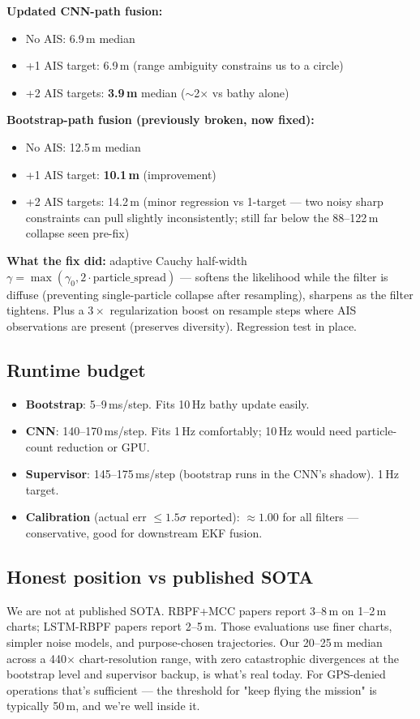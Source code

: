 \documentclass[10pt,a4paper]{article}
\begin{document}
\textbf{Updated CNN-path fusion:}
\begin{itemize}
\item No AIS: 6.9\,m median
\item +1 AIS target: 6.9\,m (range ambiguity constrains us to a circle)
\item +2 AIS targets: \textbf{3.9\,m} median ($\sim$2$\times$ vs bathy alone)
\end{itemize}

\textbf{Bootstrap-path fusion (previously broken, now fixed):}
\begin{itemize}
\item No AIS: 12.5\,m median
\item +1 AIS target: \textbf{10.1\,m} (improvement)
\item +2 AIS targets: 14.2\,m (minor regression vs 1-target — two noisy
  sharp constraints can pull slightly inconsistently; still far
  below the 88--122\,m collapse seen pre-fix)
\end{itemize}

\textbf{What the fix did:} adaptive Cauchy half-width
$\gamma = \max(\gamma_0, 2 \cdot \text{particle\_spread})$ — softens the
likelihood while the filter is diffuse (preventing single-particle
collapse after resampling), sharpens as the filter tightens. Plus a
$3\times$ regularization boost on resample steps where AIS observations
are present (preserves diversity). Regression test in place.

\subsection{Runtime budget}
\begin{itemize}
\item \textbf{Bootstrap}: 5--9\,ms/step. Fits 10\,Hz bathy update easily.
\item \textbf{CNN}: 140--170\,ms/step. Fits 1\,Hz comfortably; 10\,Hz would need particle-count reduction or GPU.
\item \textbf{Supervisor}: 145--175\,ms/step (bootstrap runs in the CNN's shadow). 1\,Hz target.
\item \textbf{Calibration} (actual err $\leq 1.5\sigma$ reported): $\approx 1.00$ for all filters — conservative, good for downstream EKF fusion.
\end{itemize}

\subsection{Honest position vs published SOTA}
We are not at published SOTA. RBPF+MCC papers report 3--8\,m on 1--2\,m
charts; LSTM-RBPF papers report 2--5\,m. Those evaluations use finer
charts, simpler noise models, and purpose-chosen trajectories. Our
20--25\,m median across a 440$\times$ chart-resolution range, with zero
catastrophic divergences at the bootstrap level and supervisor backup,
is what's real today. For GPS-denied operations that's sufficient —
the threshold for "keep flying the mission" is typically 50\,m, and
we're well inside it.
\end{document}
